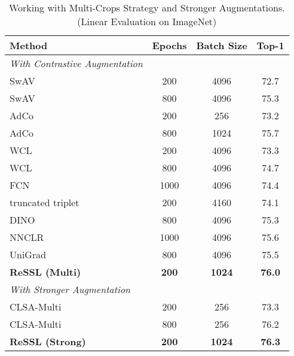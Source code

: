 \documentclass{article}
\newcommand{\<}{\left\langle}
\renewcommand{\>}{\right\rangle}
\begin{document}
\renewcommand\arraystretch{1.0}
\begin{table}[h]
 \centering
 \setlength\tabcolsep{5pt}
 \vspace{-10pt}
 \caption{Working with Multi-Crops Strategy and Stronger Augmentations. (Linear Evaluation on ImageNet)}
 \vspace{-10pt}
 \label{table:multi_crop}
\begin{tabular}{l c c c}
\toprule 
Method & Epochs & Batch Size & Top-1\\ \hline
\emph{With Contrastive Augmentation} \\
SwAV \cite{swav} & 200 & 4096 & 72.7 \\
SwAV \cite{swav} & 800 & 4096 & 75.3 \\
AdCo \cite{adco} & 200 & 256  & 73.2 \\
AdCo \cite{adco} & 800 & 1024 & 75.7 \\
WCL \cite{WCL}   & 200 & 4096  & 73.3 \\
WCL \cite{WCL}   & 800 & 4096  & 74.7 \\
FCN \cite{FNCancel} & 1000 & 4096  & 74.4 \\
truncated triplet \cite{triplet} & 200 & 4160 & 74.1 \\
DINO \cite{dino} & 800 & 4096 & 75.3 \\
NNCLR \cite{nnclr} & 1000 & 4096 & 75.6 \\
UniGrad \cite{UniGrad} & 800 & 4096 & 75.5 \\ 
\textbf{ReSSL (Multi)} & \textbf{200} & \textbf{1024} & \textbf{76.0} \\ 
\bottomrule
\emph{With Stronger Augmentation} \\
CLSA-Multi \cite{stronger} & 200 & 256 & 73.3 \\
CLSA-Multi \cite{stronger} & 800 & 256 & 76.2 \\ 
\textbf{ReSSL (Strong)} & \textbf{200} & \textbf{1024} & \textbf{76.3} \\
\bottomrule
\end{tabular}
\vspace{-5pt}
\end{table}
\end{document}

